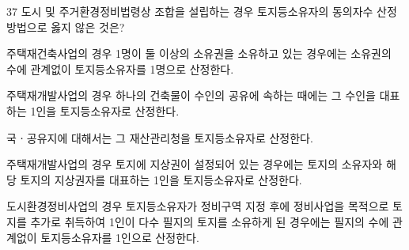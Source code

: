 \begin{question}{37}
도시 및 주거환경정비법령상 조합을 설립하는 경우 토지등소유자의 동의자수 산정방법으로 옳지 않은 것은?
\begin{choices}
  \item 주택재건축사업의 경우 1명이 둘 이상의 소유권을 소유하고 있는 경우에는 소유권의 수에 관계없이 토지등소유자를 1명으로 산정한다.
  \item 주택재개발사업의 경우 하나의 건축물이 수인의 공유에 속하는 때에는 그 수인을 대표하는 1인을 토지등소유자로 산정한다.
  \item 국ㆍ공유지에 대해서는 그 재산관리청을 토지등소유자로 산정한다.
  \item 주택재개발사업의 경우 토지에 지상권이 설정되어 있는 경우에는 토지의 소유자와 해당 토지의 지상권자를 대표하는 1인을 토지등소유자로 산정한다.
  \item 도시환경정비사업의 경우 토지등소유자가 정비구역 지정 후에 정비사업을 목적으로 토지를 추가로 취득하여 1인이 다수 필지의 토지를 소유하게 된 경우에는 필지의 수에 관계없이 토지등소유자를 1인으로 산정한다.
\end{choices}
\end{question}
